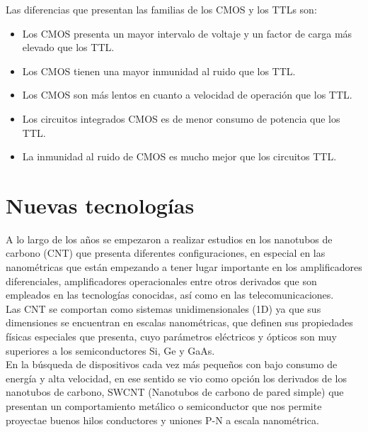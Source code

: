 \documentclass[aspectratio=169, 8pt]{beamer}
\begin{document}
	\begin{frame}
		Las diferencias que presentan las familias de los CMOS y los TTLs son:
		\begin{itemize}
			\item Los CMOS presenta un mayor intervalo de voltaje y un factor de carga más elevado que los TTL.
			\item Los CMOS tienen una mayor inmunidad al ruido que los TTL.
			\item Los CMOS son más lentos en cuanto a velocidad de operación que los TTL.
			\item Los circuitos integrados CMOS es de menor consumo de potencia que los TTL.
			\item La inmunidad al ruido de CMOS es mucho mejor que los circuitos TTL.
		\end{itemize}
	\end{frame}
	
	\section{Nuevas tecnologías}
	\begin{frame}
		A lo largo de los años se empezaron a realizar estudios en los nanotubos de carbono (CNT) que presenta diferentes configuraciones, en especial en las nanométricas que están empezando a tener lugar importante en los amplificadores diferenciales, amplificadores operacionales entre otros derivados que son empleados en las tecnologías conocidas, así como en las telecomunicaciones.\\
		
		Las CNT se comportan como sistemas unidimensionales (1D) ya que sus dimensiones se encuentran en escalas nanométricas, que definen sus propiedades físicas especiales que presenta, cuyo parámetros eléctricos y ópticos son muy superiores a los semiconductores Si, Ge y GaAs.\\
		
		En la búsqueda de dispositivos cada vez más pequeños con bajo consumo de energía y alta velocidad, en ese sentido se vio como opción los derivados de los nanotubos de carbono, SWCNT (Nanotubos de carbono de pared simple) que presentan un comportamiento metálico o semiconductor que nos permite proyectae buenos hilos conductores y uniones P-N a escala nanométrica.
	\end{frame} 
	
\end{document}
